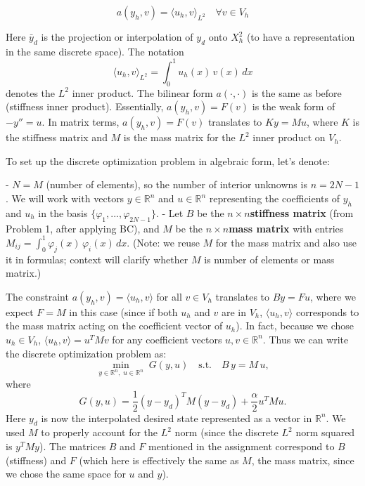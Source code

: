 \documentclass[a4paper,10pt]{report}
\begin{document}
\[
	a(y_h, v) = {\langle u_h, v \rangle}_{L^2}\quad \forall v \in V_h
\]


Here \(\bar{y}_d\) is the projection or interpolation of \(y_d\) onto \(X_h^2\) (to have a representation in the same discrete space).
The notation
\[
	{\langle u_h, v \rangle}_{L^2} = \int_0^1 u_h(x)\,v(x)\,dx
\]
denotes the \(L^2\) inner product. The bilinear form \(a(\cdot,\cdot)\) is the same as before (stiffness inner product).
Essentially, \(a(y_h,v) = F(v)\) is the weak form of \(-y''=u\). In matrix terms, \(a(y_h,v)=F(v)\) translates to \(K y = M u\), where \(K\) is the stiffness matrix and \(M\) is the mass matrix for the \(L^2\) inner product on \(V_h\).

To set up the discrete optimization problem in algebraic form, let's denote:

- \(N = M\) (number of elements), so the number of interior unknowns is \(n = 2N-1\). We will work with vectors \(y \in \mathbb{R}^n\) and \(u \in \mathbb{R}^n\) representing the coefficients of \(y_h\) and \(u_h\) in the basis \(\{\varphi_1,...,\varphi_{2N-1}\}\).
- Let \(B\) be the \(n \times n\)\textbf{stiffness matrix} (from Problem 1, after applying BC), and \(M\) be the \(n \times n\)\textbf{mass matrix} with entries \(M_{ij} = \int_0^1 \varphi_j(x)\,\varphi_i(x)\,dx\). (Note: we reuse \(M\) for the mass matrix and also use it in formulas; context will clarify whether \(M\) is number of elements or mass matrix.)

The constraint \(a(y_h,v) = \langle u_h,v\rangle\) for all \(v\in V_h\) translates to \(B y = F u\), where we expect \(F = M\) in this case (since if both \(u_h\) and \(v\) are in \(V_h\), \(\langle u_h, v\rangle\) corresponds to the mass matrix acting on the coefficient vector of \(u_h\)).
In fact, because we chose \(u_h \in V_h\), \(\langle u_h, v\rangle = u^T M v\) for any coefficient vectors \(u,v \in \mathbb{R}^n\).
Thus we can write the discrete optimization problem as:
\[\min_{y \in \mathbb{R}^n,\;u \in \mathbb{R}^n} \; G(y,u) \quad \text{s.t.}\quad B\,y = M\,u,\]
where
\[G(y,u) = \frac{1}{2}(y - y_d)^T M (y - y_d) + \frac{\alpha}{2} u^T M u.\]
Here \(y_d\) is now the interpolated desired state represented as a vector in \(\mathbb{R}^n\). We used \(M\) to properly account for the \(L^2\) norm (since the discrete \(L^2\) norm squared is \(y^T M y\)). The matrices \(B\) and \(F\) mentioned in the assignment correspond to \(B\) (stiffness) and \(F\) (which here is effectively the same as \(M\), the mass matrix, since we chose the same space for \(u\) and \(y\)).
\end{document}
